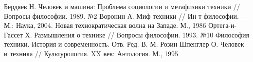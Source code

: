 \renewcommand{\refname}{Список используемой литературы}
\begin{thebibliography}{9}
     Бердяев Н. Человек и машина: Проблема социологии и 
        метафизики техники // Вопросы философии. 1989. №2 
     Воронин А. Миф техники // Ин-т философии. -- 
        М.: Наука, 2004.
     Новая технократическая волна на Западе. М., 1986
     Ортега-и-Гассет Х. Размышления о технике // 
        Вопросы философии. 1993. №10
     Философия техники. История и современность. Отв. Ред. 
        В. М. Розин
     Шпенглер О. Человек и техника // Культурология. XX век:
        Антология. М., 1995
\end{thebibliography}